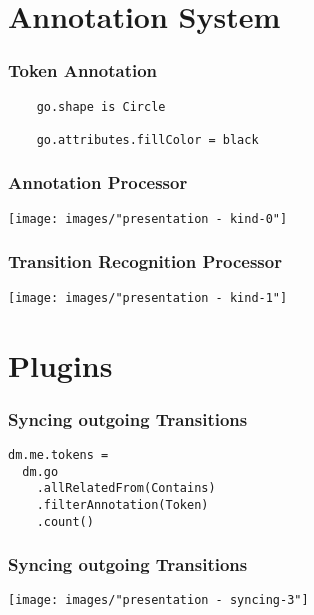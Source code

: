 \section*{Annotation System}
\begin{frame}
  \centering
  \hspace{-1cm}
  \huge
\end{frame}

\begin{frame}[fragile]
  \frametitle{Token Annotation}
  \vspace*{-1cm}
  \begin{lstlisting}
    go.shape is Circle

    go.attributes.fillColor = black
  \end{lstlisting}
\end{frame}


\begin{frame}
  \frametitle{Annotation Processor}
  \hspace{-1cm}
  \texttt{[image: images/"presentation - kind-0"]}
\end{frame}

\begin{frame}
  \frametitle{Transition Recognition Processor}
  \hspace{-1cm}
  \texttt{[image: images/"presentation - kind-1"]}
\end{frame}


\section*{Plugins}
\begin{frame}[fragile]
  \frametitle{Syncing outgoing Transitions}
  \vspace*{-1cm}
  \begin{lstlisting}
dm.me.tokens = 
  dm.go
    .allRelatedFrom(Contains)
    .filterAnnotation(Token)
    .count()
  \end{lstlisting}
\end{frame}

\begin{frame}
  \frametitle{Syncing outgoing Transitions}
  \hspace{-1cm}
  \texttt{[image: images/"presentation - syncing-3"]}
\end{frame}

\begin{frame}
  \centering
  \hspace{-1cm}
  \huge
\end{frame}

